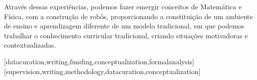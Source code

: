 \documentclass{textolivre}
\begin{document}
Através dessas experiências, podemos fazer emergir conceitos de Matemática e Física, com a construção de robôs, proporcionando a constituição de um ambiente de ensino e aprendizagem diferente de um modelo tradicional, em que podemos trabalhar o conhecimento curricular tradicional, criando situações motivadoras e contextualizadas.

\printbibliography\label{sec-bib}


\begin{contributors}
[datacuration,writing,funding,conceptualization,formalanalysis]
[supervision,writing,methodology,datacuration,conceptualization]
\end{contributors}
\end{document}
